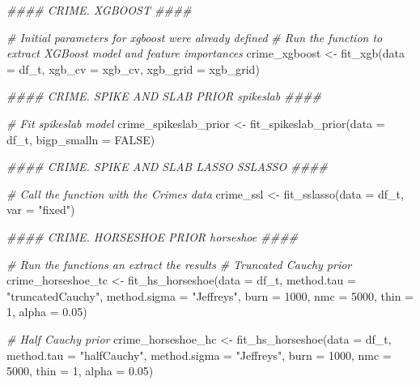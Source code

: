 \documentclass[
  11pt,
]{article}
\newenvironment{Shaded}{}{}
\newcommand{\AttributeTok}[1]{\textcolor[rgb]{0.49,0.56,0.16}{#1}}
\newcommand{\CommentTok}[1]{\textcolor[rgb]{0.38,0.63,0.69}{\textit{#1}}}
\newcommand{\ConstantTok}[1]{\textcolor[rgb]{0.53,0.00,0.00}{#1}}
\newcommand{\DecValTok}[1]{\textcolor[rgb]{0.25,0.63,0.44}{#1}}
\newcommand{\DocumentationTok}[1]{\textcolor[rgb]{0.73,0.13,0.13}{\textit{#1}}}
\newcommand{\FloatTok}[1]{\textcolor[rgb]{0.25,0.63,0.44}{#1}}
\newcommand{\FunctionTok}[1]{\textcolor[rgb]{0.02,0.16,0.49}{#1}}
\newcommand{\NormalTok}[1]{#1}
\newcommand{\OtherTok}[1]{\textcolor[rgb]{0.00,0.44,0.13}{#1}}
\newcommand{\StringTok}[1]{\textcolor[rgb]{0.25,0.44,0.63}{#1}}
\begin{document}
\begin{Shaded}
\begin{Highlighting}[]
\DocumentationTok{\#\#\#\# CRIME. XGBOOST \#\#\#\#}

\CommentTok{\# Initial parameters for xgboost were already defined}
\CommentTok{\# Run the function to extract XGBoost model and feature importances}
\NormalTok{crime\_xgboost }\OtherTok{\textless{}{-}} \FunctionTok{fit\_xgb}\NormalTok{(}\AttributeTok{data =}\NormalTok{ df\_t, }\AttributeTok{xgb\_cv =}\NormalTok{ xgb\_cv, }\AttributeTok{xgb\_grid =}\NormalTok{ xgb\_grid)}

\DocumentationTok{\#\#\#\# CRIME. SPIKE AND SLAB PRIOR \textquotesingle{}spikeslab\textquotesingle{} \#\#\#\#}

\CommentTok{\# Fit spikeslab model}
\NormalTok{crime\_spikeslab\_prior }\OtherTok{\textless{}{-}} \FunctionTok{fit\_spikeslab\_prior}\NormalTok{(}\AttributeTok{data =}\NormalTok{ df\_t, }\AttributeTok{bigp\_smalln =} \ConstantTok{FALSE}\NormalTok{)}

\DocumentationTok{\#\#\#\# CRIME. SPIKE AND SLAB LASSO \textquotesingle{}SSLASSO\textquotesingle{} \#\#\#\#}

\CommentTok{\# Call the function with the Crimes data}
\NormalTok{crime\_ssl }\OtherTok{\textless{}{-}} \FunctionTok{fit\_sslasso}\NormalTok{(}\AttributeTok{data =}\NormalTok{ df\_t, }\AttributeTok{var =} \StringTok{"fixed"}\NormalTok{)}

\DocumentationTok{\#\#\#\# CRIME. HORSESHOE PRIOR \textquotesingle{}horseshoe\textquotesingle{} \#\#\#\#}

\CommentTok{\# Run the functions an extract the results}
\CommentTok{\# Truncated Cauchy prior}
\NormalTok{crime\_horseshoe\_tc }\OtherTok{\textless{}{-}} \FunctionTok{fit\_hs\_horseshoe}\NormalTok{(}\AttributeTok{data =}\NormalTok{ df\_t, }\AttributeTok{method.tau =} \StringTok{"truncatedCauchy"}\NormalTok{,}
                                         \AttributeTok{method.sigma =} \StringTok{"Jeffreys"}\NormalTok{, }\AttributeTok{burn =} \DecValTok{1000}\NormalTok{, }
                                         \AttributeTok{nmc =} \DecValTok{5000}\NormalTok{, }\AttributeTok{thin =} \DecValTok{1}\NormalTok{, }\AttributeTok{alpha =} \FloatTok{0.05}\NormalTok{)}

\CommentTok{\# Half Cauchy prior}
\NormalTok{crime\_horseshoe\_hc }\OtherTok{\textless{}{-}} \FunctionTok{fit\_hs\_horseshoe}\NormalTok{(}\AttributeTok{data =}\NormalTok{ df\_t, }\AttributeTok{method.tau =} \StringTok{"halfCauchy"}\NormalTok{,}
                                             \AttributeTok{method.sigma =} \StringTok{"Jeffreys"}\NormalTok{, }
                                             \AttributeTok{burn =} \DecValTok{1000}\NormalTok{, }\AttributeTok{nmc =} \DecValTok{5000}\NormalTok{, }
                                             \AttributeTok{thin =} \DecValTok{1}\NormalTok{, }\AttributeTok{alpha =} \FloatTok{0.05}\NormalTok{)}


\end{Highlighting}
\end{Shaded}
\end{document}
